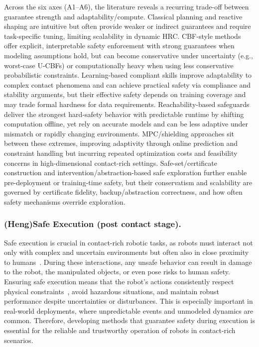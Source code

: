 \documentclass[Afour,sageh,times]{template/sagej}
\newcommand{\suggest}[1]{{\color{olive} (#1)}}
\begin{document}
Across the six axes (A1--A6), the literature reveals a recurring trade-off between guarantee strength and adaptability/compute. Classical planning and reactive shaping are intuitive but often provide weaker or indirect guarantees and require task-specific tuning, limiting scalability in dynamic HRC. CBF-style methods offer explicit, interpretable safety enforcement with strong guarantees when modeling assumptions hold, but can become conservative under uncertainty (e.g., worst-case U-CBFs) or computationally heavy when using less conservative probabilistic constraints. Learning-based compliant skills improve adaptability to complex contact phenomena and can achieve practical safety via compliance and stability arguments, but their effective safety depends on training coverage and may trade formal hardness for data requirements. Reachability-based safeguards deliver the strongest hard-safety behavior with predictable runtime by shifting computation offline, yet rely on accurate models and can be less adaptive under mismatch or rapidly changing environments. MPC/shielding approaches sit between these extremes, improving adaptivity through online prediction and constraint handling but incurring repeated optimization costs and feasibility concerns in high-dimensional contact-rich settings. Safe-set/certificate construction and intervention/abstraction-based safe exploration further enable pre-deployment or training-time safety, but their conservatism and scalability are governed by certificate fidelity, backup/abstraction correctness, and how often safety mechanisms override exploration.


\subsubsection{\suggest{Heng}{Safe Execution (post contact stage).}}
Safe execution is crucial in contact-rich robotic tasks, as robots must interact not only with complex and uncertain environments but often also in close proximity to humans~\citep{ajoudani2018progress}. During these interactions, any unsafe behavior can result in damage to the robot, the manipulated objects, or even pose risks to human safety. Ensuring safe execution means that the robot's actions consistently respect physical constraints~\cite{141}, avoid hazardous situations, and maintain robust performance despite uncertainties or disturbances. This is especially important in real-world deployments, where unpredictable events and unmodeled dynamics are common. Therefore, developing methods that guarantee safety during execution is essential for the reliable and trustworthy operation of robots in contact-rich scenarios.
\end{document}

